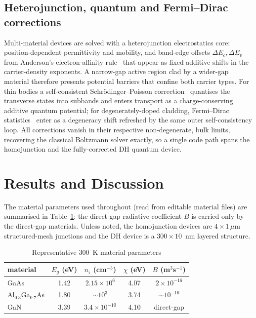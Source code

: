 \documentclass[conference]{IEEEtran}
\begin{document}
\subsection{Heterojunction, quantum and Fermi--Dirac corrections}
\label{sec:hetero}
Multi-material devices are solved with a heterojunction electrostatics core:
position-dependent permittivity and mobility, and band-edge offsets
$\Delta E_c,\Delta E_v$ from Anderson's electron-affinity rule~\cite{anderson} that
appear as fixed additive shifts in the carrier-density exponents. A narrow-gap
active region clad by a wider-gap material therefore presents potential barriers
that confine both carrier types. For thin bodies a self-consistent
Schr\"odinger--Poisson correction~\cite{trellakis} quantises the transverse states
into subbands and enters transport as a charge-conserving additive quantum
potential; for degenerately-doped cladding, Fermi--Dirac statistics~\cite{sze}
enter as a degeneracy shift refreshed by the same outer self-consistency loop. All
corrections vanish in their respective non-degenerate, bulk limits, recovering the
classical Boltzmann solver exactly, so a single code path spans the homojunction
and the fully-corrected DH quantum device.

\section{Results and Discussion}
\label{sec:results}
The material parameters used throughout (read from editable material files) are
summarised in Table~\ref{tab:params}; the direct-gap radiative coefficient $B$ is
carried only by the direct-gap materials. Unless noted, the homojunction devices
are $4\times1\,\mu$m structured-mesh junctions and the DH device is a
$300\times10$~nm layered structure.

\begin{table}[!t]
\caption{Representative 300~K material parameters}
\label{tab:params}
\centering
\begin{tabular}{lcccc}
\toprule
material & $E_g$ (eV) & $n_i$ (cm$^{-3}$) & $\chi$ (eV) & $B$ (m$^3$s$^{-1}$)\\
\midrule
GaAs   & 1.42 & $2.15\times10^{6}$ & 4.07 & $2\times10^{-16}$\\
Al$_{0.3}$Ga$_{0.7}$As & 1.80 & $\sim\!10^{3}$ & 3.74 & $\sim\!10^{-16}$\\
GaN    & 3.39 & $3.4\times10^{-10}$ & 4.10 & direct-gap\\
\bottomrule
\end{tabular}
\end{table}
\end{document}
